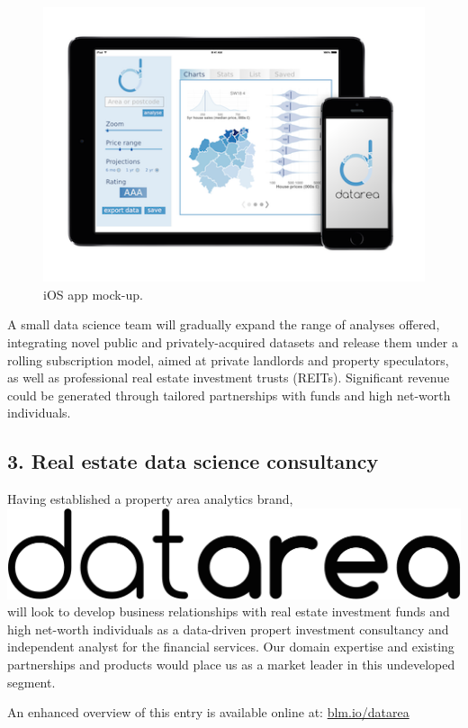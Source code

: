 \documentclass[
10pt, %
a4paper, %
oneside, %
headinclude,footinclude, %
BCOR5mm, %
]{scrartcl}
\newcommand*{\logo}{\includegraphics[scale=.04]{Figures/logotext.png}}
\begin{document}
\begin{figure}
\centering
\includegraphics[width=.39\textwidth]{Figures/mockup.png}
\caption{ iOS app mock-up.}
\vspace{-2em}
\end{figure}

A small data science team will gradually expand the range of analyses
offered, integrating novel public and privately-acquired datasets and
release them under a rolling subscription model, aimed at private
landlords and property speculators, as well as professional real
estate investment trusts (REITs). Significant revenue could be
generated through tailored partnerships with funds and high net-worth
individuals.

\subsection*{3. Real estate data science consultancy}

Having established a property area analytics brand, \logo\hspace{.1em}
will look to develop business relationships with real estate
investment funds and high net-worth individuals as a data-driven
propert investment consultancy and independent analyst for the
financial services. Our domain expertise and existing partnerships and
products would place us as a market leader in this undeveloped segment.


\vspace{1em}
\begin{flushright}
{\small An enhanced overview of this entry is available online at: \leavevmode\href{http://blm.io/datarea}{blm.io/datarea}}
\end{flushright}
\end{document}

